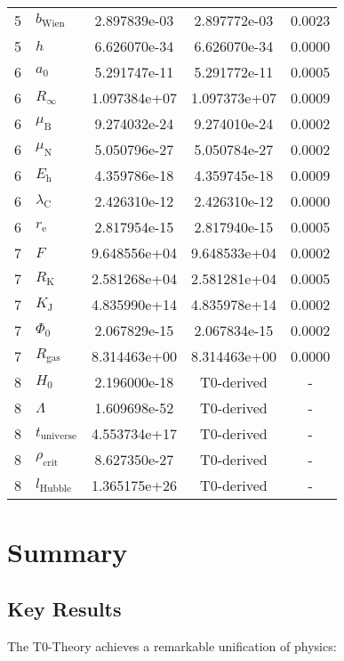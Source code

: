 \documentclass[11pt,a4paper]{article}
\begin{document}
\begin{longtable}{p{1.5cm}p{3cm}S[table-format=1.6e2]S[table-format=1.6e2]S[table-format=2.4]}
5 & $b_{\text{Wien}}$ & 2.897839e-03 & 2.897772e-03 & 0.0023 \\
5 & $h$ & 6.626070e-34 & 6.626070e-34 & 0.0000 \\
6 & $a_0$ & 5.291747e-11 & 5.291772e-11 & 0.0005 \\
6 & $R_{\infty}$ & 1.097384e+07 & 1.097373e+07 & 0.0009 \\
6 & $\mu_{\text{B}}$ & 9.274032e-24 & 9.274010e-24 & 0.0002 \\
6 & $\mu_{\text{N}}$ & 5.050796e-27 & 5.050784e-27 & 0.0002 \\
6 & $E_{\text{h}}$ & 4.359786e-18 & 4.359745e-18 & 0.0009 \\
6 & $\lambda_{\text{C}}$ & 2.426310e-12 & 2.426310e-12 & 0.0000 \\
6 & $r_{\text{e}}$ & 2.817954e-15 & 2.817940e-15 & 0.0005 \\
7 & $F$ & 9.648556e+04 & 9.648533e+04 & 0.0002 \\
7 & $R_{\text{K}}$ & 2.581268e+04 & 2.581281e+04 & 0.0005 \\
7 & $K_{\text{J}}$ & 4.835990e+14 & 4.835978e+14 & 0.0002 \\
7 & $\Phi_0$ & 2.067829e-15 & 2.067834e-15 & 0.0002 \\
7 & $R_{\text{gas}}$ & 8.314463e+00 & 8.314463e+00 & 0.0000 \\
8 & $H_0$ & 2.196000e-18 & {T0-derived} & {-} \\
8 & $\Lambda$ & 1.609698e-52 & {T0-derived} & {-} \\
8 & $t_{\text{universe}}$ & 4.553734e+17 & {T0-derived} & {-} \\
8 & $\rho_{\text{crit}}$ & 8.627350e-27 & {T0-derived} & {-} \\
8 & $l_{\text{Hubble}}$ & 1.365175e+26 & {T0-derived} & {-} \\
\end{longtable}

\section{Summary}

\subsection{Key Results}

The T0-Theory achieves a remarkable unification of physics:
\end{document}
